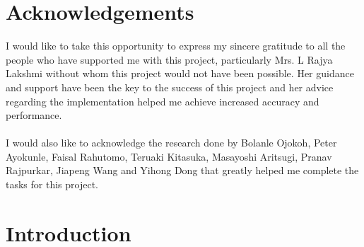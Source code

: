 \documentclass[12pt, a4paper]{article}
\begin{document}
\newpage
\section*{Acknowledgements}

I would like to take this opportunity to express my sincere gratitude to all the people who have supported me with this project, particularly Mrs. L Rajya Lakshmi without whom this project would not have been possible. Her guidance and support have been the key to the success of this project and her advice regarding the implementation helped me achieve increased accuracy and performance. 
\\~\\
I would also like to acknowledge the research done by Bolanle Ojokoh, Peter Ayokunle, Faisal Rahutomo, Teruaki Kitasuka, Masayoshi Aritsugi, Pranav Rajpurkar, Jiapeng Wang and Yihong Dong that greatly helped me complete the tasks for this project. 

\newpage 
\tableofcontents

\newpage 
\section{Introduction}
\end{document}
